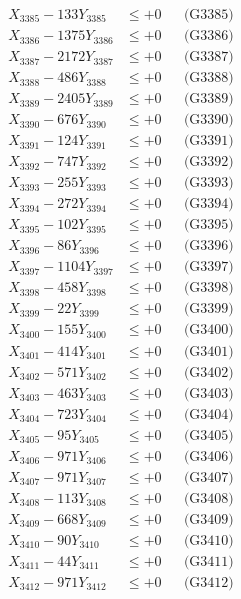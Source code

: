 \documentclass[a4paper,10pt]{article}
\begin{document}
{\begin{align}
X_{3385} - 133Y_{3385} &\leq +0 && \text{(G3385)} \\
X_{3386} - 1375Y_{3386} &\leq +0 && \text{(G3386)} \\
X_{3387} - 2172Y_{3387} &\leq +0 && \text{(G3387)} \\
X_{3388} - 486Y_{3388} &\leq +0 && \text{(G3388)} \\
X_{3389} - 2405Y_{3389} &\leq +0 && \text{(G3389)} \\
X_{3390} - 676Y_{3390} &\leq +0 && \text{(G3390)} \\
\allowbreak
X_{3391} - 124Y_{3391} &\leq +0 && \text{(G3391)} \\
X_{3392} - 747Y_{3392} &\leq +0 && \text{(G3392)} \\
X_{3393} - 255Y_{3393} &\leq +0 && \text{(G3393)} \\
X_{3394} - 272Y_{3394} &\leq +0 && \text{(G3394)} \\
X_{3395} - 102Y_{3395} &\leq +0 && \text{(G3395)} \\
X_{3396} - 86Y_{3396} &\leq +0 && \text{(G3396)} \\
X_{3397} - 1104Y_{3397} &\leq +0 && \text{(G3397)} \\
X_{3398} - 458Y_{3398} &\leq +0 && \text{(G3398)} \\
X_{3399} - 22Y_{3399} &\leq +0 && \text{(G3399)} \\
X_{3400} - 155Y_{3400} &\leq +0 && \text{(G3400)} \\
\allowbreak
X_{3401} - 414Y_{3401} &\leq +0 && \text{(G3401)} \\
X_{3402} - 571Y_{3402} &\leq +0 && \text{(G3402)} \\
X_{3403} - 463Y_{3403} &\leq +0 && \text{(G3403)} \\
X_{3404} - 723Y_{3404} &\leq +0 && \text{(G3404)} \\
X_{3405} - 95Y_{3405} &\leq +0 && \text{(G3405)} \\
X_{3406} - 971Y_{3406} &\leq +0 && \text{(G3406)} \\
X_{3407} - 971Y_{3407} &\leq +0 && \text{(G3407)} \\
X_{3408} - 113Y_{3408} &\leq +0 && \text{(G3408)} \\
X_{3409} - 668Y_{3409} &\leq +0 && \text{(G3409)} \\
X_{3410} - 90Y_{3410} &\leq +0 && \text{(G3410)} \\
\allowbreak
X_{3411} - 44Y_{3411} &\leq +0 && \text{(G3411)} \\
X_{3412} - 971Y_{3412} &\leq +0 && \text{(G3412)} \\

\end{align}}
\end{document}
